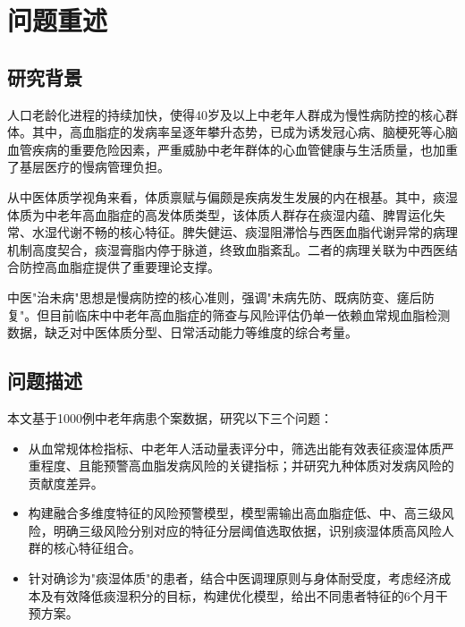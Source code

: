 \documentclass[12pt,a4paper]{ctexart}
\begin{document}
\section{问题重述}

\subsection{研究背景}

人口老龄化进程的持续加快，使得40岁及以上中老年人群成为慢性病防控的核心群体。其中，高血脂症的发病率呈逐年攀升态势，已成为诱发冠心病、脑梗死等心脑血管疾病的重要危险因素，严重威胁中老年群体的心血管健康与生活质量，也加重了基层医疗的慢病管理负担。

从中医体质学视角来看，体质禀赋与偏颇是疾病发生发展的内在根基。其中，痰湿体质为中老年高血脂症的高发体质类型，该体质人群存在痰湿内蕴、脾胃运化失常、水湿代谢不畅的核心特征。脾失健运、痰湿阻滞恰与西医血脂代谢异常的病理机制高度契合，痰湿膏脂内停于脉道，终致血脂紊乱。二者的病理关联为中西医结合防控高血脂症提供了重要理论支撑。

中医"治未病"思想是慢病防控的核心准则，强调"未病先防、既病防变、瘥后防复"。但目前临床中中老年高血脂症的筛查与风险评估仍单一依赖血常规血脂检测数据，缺乏对中医体质分型、日常活动能力等维度的综合考量。

\subsection{问题描述}

本文基于1000例中老年病患个案数据，研究以下三个问题：

\begin{itemize}
    \item[\textbf{问题1}] 从血常规体检指标、中老年人活动量表评分中，筛选出能有效表征痰湿体质严重程度、且能预警高血脂发病风险的关键指标；并研究九种体质对发病风险的贡献度差异。

    \item[\textbf{问题2}] 构建融合多维度特征的风险预警模型，模型需输出高血脂症低、中、高三级风险，明确三级风险分别对应的特征分层阈值选取依据，识别痰湿体质高风险人群的核心特征组合。

    \item[\textbf{问题3}] 针对确诊为"痰湿体质"的患者，结合中医调理原则与身体耐受度，考虑经济成本及有效降低痰湿积分的目标，构建优化模型，给出不同患者特征的6个月干预方案。
\end{itemize}

\end{document}
